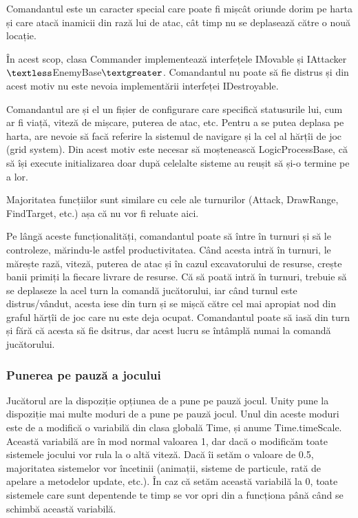 \documentclass[12pt, a4paper]{article}
\begin{document}
	Comandantul este un caracter special care poate fi mișcât oriunde dorim pe harta și care atacă inamicii din rază lui de atac, cât timp nu se deplasează către o nouă locație.
	\newline
	
	În acest scop, clasa Commander implementează interfețele IMovable și IAttacker$\textless$EnemyBase$\textgreater$. Comandantul nu poate să fie distrus și din acest motiv nu este nevoia implementării interfeței IDestroyable.
	\newline
	
	Comandantul are și el un fișier de configurare care specifică statusurile lui, cum ar fi viață, viteză de mișcare, puterea de atac, etc. Pentru a se putea deplasa pe harta, are nevoie să facă referire la sistemul de navigare și la cel al hărțîi de joc (grid system). Din acest motiv este necesar să moștenească LogicProcessBase, că să își execute initializarea doar după celelalte sisteme au reușit să și-o termine pe a lor.
	\newline
	
	Majoritatea funcțiilor sunt similare cu cele ale turnurilor (Attack, DrawRange, FindTarget, etc.) așa că nu vor fi reluate aici. 
	\newline
	
	Pe lângă aceste funcționalități, comandantul poate să între în turnuri și să le controleze, mărindu-le astfel productivitatea. Când acesta intră în turnuri, le mărește rază, viteză, puterea de atac și în cazul excavatorului de resurse, crește banii primiți la fiecare livrare de resurse. Că să poată intră în turnuri, trebuie să se deplaseze la acel turn la comandă jucătorului, iar când turnul este distrus/vândut, acesta iese din turn și se mișcă către cel mai apropiat nod din graful hărțîi de joc care nu este deja ocupat. Comandantul poate să iasă din turn și fără că acesta să fie dsitrus, dar acest lucru se întâmplă numai la comandă jucătorului.
	
	
	
	
	
	\subsubsection{Punerea pe pauză a jocului}
	
	Jucătorul are la dispoziție opțiunea de a pune pe pauză jocul. Unity pune la dispoziție mai multe moduri de a pune pe pauză jocul. Unul din aceste moduri este de a modifică o variabilă din clasa globală Time, și anume Time.timeScale. Această variabilă are în mod normal valoarea 1, dar dacă o modificăm toate sistemele jocului vor rula la o altă viteză. Dacă îi setăm o valoare de 0.5, majoritatea sistemelor vor încetinii (animații, sisteme de particule, rată de apelare a metodelor update, etc.). În caz că setăm această variabilă la 0, toate sistemele care sunt depentende te timp se vor opri din a funcționa până când se schimbă această variabilă. 
	\newline
	
\end{document}
